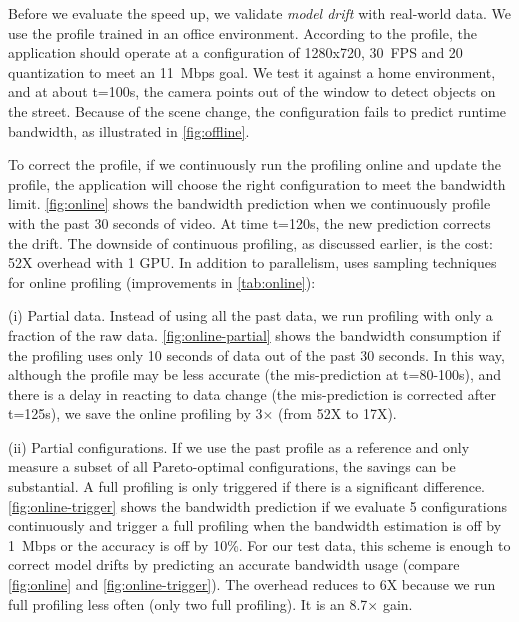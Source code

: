 Before we evaluate the speed up, we validate \textit{model drift} with
real-world data. We use the profile trained in an office environment.  According
to the profile, the application should operate at a configuration of 1280x720,
\SI{30}{FPS} and 20 quantization to meet an \SI{11}{Mbps} goal.  We test it
against a home environment, and at about t=100s, the camera points out of the
window to detect objects on the street. Because of the scene change, the
configuration fails to predict runtime bandwidth, as illustrated in
\autoref{fig:offline}.

To correct the profile, if we continuously run the profiling online and update
the profile, the application will choose the right configuration to meet the
bandwidth limit.  \autoref{fig:online} shows the bandwidth prediction when we
continuously profile with the past 30 seconds of video. At time t=120s, the new
prediction corrects the drift. The downside of continuous profiling, as
discussed earlier, is the cost: 52X overhead with 1 GPU\@. In addition to
parallelism, \sysname{} uses sampling techniques for online profiling
(improvements in \autoref{tab:online}):

(i) Partial data. Instead of using all the past data, we run profiling with only
a fraction of the raw data.  \autoref{fig:online-partial} shows the bandwidth
consumption if the profiling uses only 10 seconds of data out of the past 30
seconds. In this way, although the profile may be less accurate (the
mis-prediction at t=80-100s), and there is a delay in reacting to data change
(the mis-prediction is corrected after t=125s), we save the online profiling by
3$\times$ (from 52X to 17X).

(ii) Partial configurations. If we use the past profile as a reference and only
measure a subset of all Pareto-optimal configurations, the savings can be
substantial. A full profiling is only triggered if there is a significant
difference. \autoref{fig:online-trigger} shows the bandwidth prediction if we
evaluate 5 configurations continuously and trigger a full profiling when the
bandwidth estimation is off by \SI{1}{Mbps} or the accuracy is off by 10\%.  For
our test data, this scheme is enough to correct model drifts by predicting an
accurate bandwidth usage (compare \autoref{fig:online} and
\autoref{fig:online-trigger}).  The overhead reduces to 6X because we run full
profiling less often (only two full profiling). It is an 8.7$\times$ gain.

